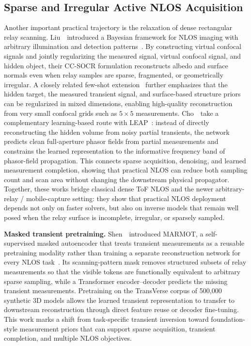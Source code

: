 \subsection{Sparse and Irregular Active NLOS Acquisition}
Another important practical trajectory is the relaxation of dense rectangular relay scanning. Liu~\etal~introduced a Bayesian framework for NLOS imaging with arbitrary illumination and detection patterns~\cite{liuArbitraryPatternNLOS2023}. By constructing virtual confocal signals and jointly regularizing the measured signal, virtual confocal signal, and hidden object, their CC-SOCR formulation reconstructs albedo and surface normals even when relay samples are sparse, fragmented, or geometrically irregular. A closely related few-shot extension~\cite{liuFewShotSSCR2022} further emphasizes that the hidden target, the measured transient signal, and surface-based structure priors can be regularized in mixed dimensions, enabling high-quality reconstruction from very small confocal grids such as $5\times5$ measurements. Cho~\etal~take a complementary learning-based route with LEAP~\cite{choLEAP2024}: instead of directly reconstructing the hidden volume from noisy partial transients, the network predicts clean full-aperture phasor fields from partial measurements and constrains the learned representation to the informative frequency band of phasor-field propagation. This connects sparse acquisition, denoising, and learned measurement completion, showing that practical NLOS can reduce both sampling count and scan area without changing the downstream physical propagator. Together, these works bridge classical dense ToF NLOS and the newer arbitrary-relay / mobile-capture setting: they show that practical NLOS deployment depends not only on faster solvers, but also on inverse models that remain well posed when the relay surface is incomplete, irregular, or sparsely sampled.

\vspace{0.8mm}
\noindent \textbf{Masked transient pretraining.}
Shen~\etal~introduced MARMOT, a self-supervised masked autoencoder that treats transient measurements as a reusable pretraining modality rather than training a separate reconstruction network for every NLOS task~\cite{shen2026marmot}. Its scanning-pattern mask removes structured subsets of relay measurements so that the visible tokens are functionally equivalent to arbitrary sparse sampling, while a Transformer encoder--decoder predicts the missing transient measurements. Pretraining on the TransVerse corpus of 500,000 synthetic 3D models allows the learned transient representation to transfer to downstream reconstruction through direct feature reuse or decoder fine-tuning. This work marks a shift from task-specific transient inversion toward foundation-style measurement priors that can support sparse acquisition, transient completion, and multiple NLOS objectives.

